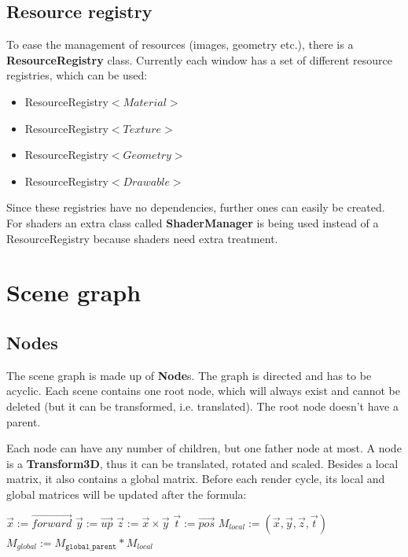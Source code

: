 \documentclass[12p, paper=a4, leqno, colorinlistoftodos]{article}
\begin{document}
		\subsection{Resource registry}
		To ease the management of resources (images, geometry etc.), there is a \textbf{ResourceRegistry} class. Currently each window has a set of different resource registries, which can be used:
		\begin{itemize}
			\item ResourceRegistry$<Material>$
			\item ResourceRegistry$<Texture>$
			\item ResourceRegistry$<Geometry>$
			\item ResourceRegistry$<Drawable>$
		\end{itemize}
		Since these registries have no dependencies, further ones can easily be created. For shaders an extra class called \textbf{ShaderManager} is being used instead of a ResourceRegistry because shaders need extra treatment.
		
	\pagebreak
	\section{Scene graph}
		\subsection{Nodes}
			The scene graph is made up of \textbf{Node}s. The graph is directed and has to be acyclic. Each scene contains one root node, which will always exist and cannot be deleted (but it can be transformed, i.e. translated). The root node doesn't have a parent.
			
			Each node can have any number of children, but one father node at most. A node is a \textbf{Transform3D}, thus it can be translated, rotated and scaled. Besides a local matrix, it also contains a global matrix. Before each render cycle, its local and global matrices will be updated after the formula:
			\begin{algorithm}
				\begin{algorithmic}[1]
					\State $\vec{x} := \vec{forward}$
					\State $\vec{y} := \vec{up}$
					\State $\vec{z} := \vec{x} \times \vec{y}$
					\State $\vec{t} := \vec{pos}$
					\State $M_{local} := (\vec{x}, \vec{y}, \vec{z}, \vec{t})$
					\State $M_{global} := M_{\texttt{global\_parent}} * M_{local}$
				\end{algorithmic}
			\end{algorithm}
				
\end{document}
